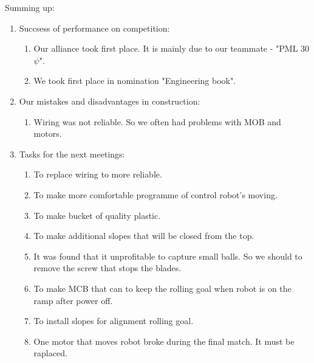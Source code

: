 Summing up:
\begin{enumerate}
  \item Succsess of performance on competition:
  \begin{enumerate}
	\item Our alliance took first place. It is mainly due to our teammate - "PML 30 ${\psi}$".
	
	\item We took first place in nomination "Engineering book".
	
  \end{enumerate}
  
  \item Our mistakes and disadvantages in construction:
  \begin{enumerate}
  	\item Wiring was not reliable. So we often had problems with MOB and motors.
  	
  \end{enumerate}
  
  \item Tasks for the next meetings:
  \begin{enumerate}
  	\item To replace wiring to more reliable.
  	
  	\item To make more comfortable programme of control robot's moving.
  	
  	\item To make bucket of quality plastic.
  	
  	\item To make additional slopes that will be closed from the top.
  	
  	\item It was found that it unprofitable to capture small balls. So we should to remove the screw that stops the blades.
  	
  	\item To make MCB that can to keep the rolling goal when robot is on the ramp after power off.
  	  	
  	\item To install slopes for alignment rolling goal.
  	
  	\item One motor that moves robot broke during the final match. It must be raplaced.
  	
  \end{enumerate}
  
\end{enumerate}
\fillpage